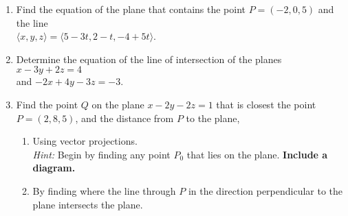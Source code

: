 \documentclass[12pt]{article}
\begin{document}
\begin{enumerate}

  
 \item Find the equation of the plane that contains the point $P=(-2,0,5)$ and the line\\ $\langle x,y,z\rangle = \langle 5-3t,2-t,-4+5t\rangle$.


\vspace{3.75in}

\item Determine the equation of the line of intersection of the planes $x-3y+2z=4$\\ and $-2x+4y-3z=-3$.


 
\newpage


\item Find the point $Q$ on the plane $x-2y-2z=1$ that is closest the point $P=(2,8,5)$, and the distance from $P$ to the plane,
\begin{enumerate}
\item Using vector projections.\\
{\em Hint:} Begin by finding any point $P_0$ that lies on the plane. {\bf Include a diagram.}

\vspace{3.75in}

\item By finding where the line through $P$ in the direction perpendicular to the plane intersects the plane.

\end{enumerate}

\end{enumerate}
  
\end{document}
